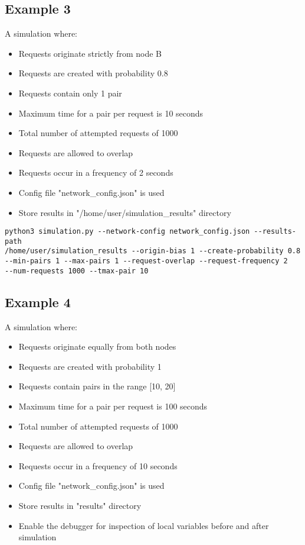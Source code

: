 \documentclass{article}
\begin{document}
\subsection{Example 3}
A simulation where:
\begin{itemize}
    \item Requests originate strictly from node B
    \item Requests are created with probability 0.8
    \item Requests contain only 1 pair
    \item Maximum time for a pair per request is 10 seconds
    \item Total number of attempted requests of 1000
    \item Requests are allowed to overlap
    \item Requests occur in a frequency of 2 seconds
    \item Config file "network\_config.json" is used
    \item Store results in "/home/user/simulation\_results" directory
\end{itemize}

\begin{verbatim}
python3 simulation.py --network-config network_config.json --results-path
/home/user/simulation_results --origin-bias 1 --create-probability 0.8
--min-pairs 1 --max-pairs 1 --request-overlap --request-frequency 2
--num-requests 1000 --tmax-pair 10
\end{verbatim}

\subsection{Example 4}
A simulation where:
\begin{itemize}
    \item Requests originate equally from both nodes
    \item Requests are created with probability 1
    \item Requests contain pairs in the range [10, 20]
    \item Maximum time for a pair per request is 100 seconds
    \item Total number of attempted requests of 1000
    \item Requests are allowed to overlap
    \item Requests occur in a frequency of 10 seconds
    \item Config file "network\_config.json" is used
    \item Store results in "results" directory
    \item Enable the debugger for inspection of local variables before and after simulation
\end{itemize}
\end{document}
